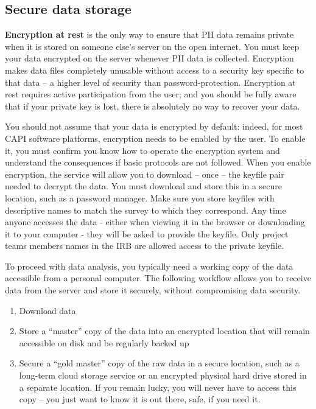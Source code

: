 {\subsection{Secure data storage}
\textbf{Encryption at rest} is the only way to ensure that PII data remains private when it is stored on someone else's server on the open internet. You must keep your data encrypted on the server whenever PII data is collected.
Encryption makes data files completely unusable without access to a security key specific to that data -- a higher level of security than password-protection. 
Encryption at rest requires active participation from the user; and you should be fully aware that if your private key is lost, there is absolutely no way to recover your data.

You should not assume that your data is encrypted by default: indeed, for most CAPI software platforms, encryption needs to be enabled by the user. 
To enable it, you must confirm you know how to operate the encryption system and understand the consequences if basic protocols are not followed.
When you enable encryption, the service will allow you to download -- once -- the keyfile pair needed to decrypt the data.
You must download and store this in a secure location, such as a password manager. Make sure you store keyfiles with descriptive names to match the survey to which they correspond.
Any time anyone accesses the data - either when viewing it in the browser or downloading it to your computer - they will be asked to provide the keyfile. 
Only project teams members names in the IRB are allowed access to the private keyfile. 

To proceed with data analysis, you typically need a working copy of the data accessible from a personal computer. The following workflow allows you to receive data from the server and store it securely, without compromising data security. 

\begin{enumerate}
	\item Download data
	\item Store a ``master'' copy of the data into an encrypted location that will remain accessible on disk and be regularly backed up
	\item Secure a ``gold master'' copy of the raw data in a secure location, such as a long-term cloud storage service or an encrypted physical hard drive stored in a separate location. If you remain lucky, you will never have to access this copy -- you just want to know it is out there, safe, if you need it.
	

\end{enumerate}}
